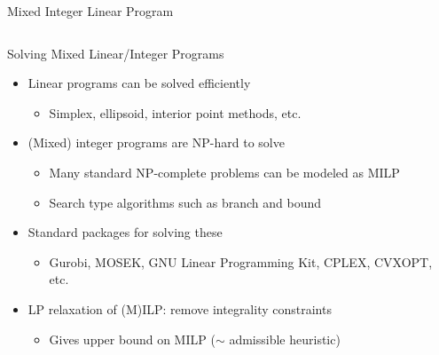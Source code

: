 \documentclass[11pt,aspectratio=169,handout]{beamer}
\begin{document}
\begin{frame}{Mixed Integer Linear Program}
\begin{columns}
\begin{column}{0.7\textwidth}
\begin{center}
     \end{center}
    \end{column}
   \end{columns}
  \end{frame}
 
  \begin{frame}{Solving Mixed Linear/Integer Programs}
   \begin{itemize}[<+->]
   \setlength{\itemsep}{1.5em}
    \item Linear programs can be solved efficiently
    \begin{itemize}
     \item Simplex, ellipsoid, interior point methods, etc.
    \end{itemize}
    \item (Mixed) integer programs are \alert{NP-hard} to solve
    \begin{itemize}
     \item Many standard NP-complete problems can be modeled as MILP
     \item Search type algorithms such as branch and bound
    \end{itemize}
    \item Standard packages for solving these
    \begin{itemize}
     \item Gurobi, MOSEK, GNU Linear Programming Kit, CPLEX, CVXOPT, etc.
    \end{itemize}
    \item LP relaxation of (M)ILP: remove integrality constraints
    \begin{itemize}
     \item Gives upper bound on MILP ($\sim$ admissible heuristic)
    \end{itemize}
   \end{itemize}
  \end{frame}
 
\end{document}
